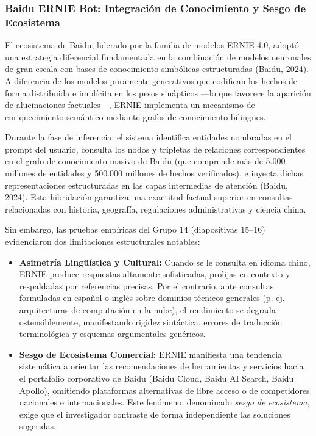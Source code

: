 \subsubsection{Baidu ERNIE Bot: Integración de Conocimiento y Sesgo de Ecosistema}

El ecosistema de Baidu, liderado por la familia de modelos ERNIE 4.0, adoptó una estrategia diferencial fundamentada en la combinación de modelos neuronales de gran escala con bases de conocimiento simbólicas estructuradas (Baidu, 2024). A diferencia de los modelos puramente generativos que codifican los hechos de forma distribuida e implícita en los pesos sinápticos ---lo que favorece la aparición de alucinaciones factuales---, ERNIE implementa un mecanismo de enriquecimiento semántico mediante grafos de conocimiento bilingües.

Durante la fase de inferencia, el sistema identifica entidades nombradas en el prompt del usuario, consulta los nodos y tripletas de relaciones correspondientes en el grafo de conocimiento masivo de Baidu (que comprende más de 5.000 millones de entidades y 500.000 millones de hechos verificados), e inyecta dichas representaciones estructuradas en las capas intermedias de atención (Baidu, 2024). Esta hibridación garantiza una exactitud factual superior en consultas relacionadas con historia, geografía, regulaciones administrativas y ciencia china.

Sin embargo, las pruebas empíricas del Grupo 14 (diapositivas 15--16) evidenciaron dos limitaciones estructurales notables:
\begin{itemize}
    \item \textbf{Asimetría Lingüística y Cultural:} Cuando se le consulta en idioma chino, ERNIE produce respuestas altamente sofisticadas, prolijas en contexto y respaldadas por referencias precisas. Por el contrario, ante consultas formuladas en español o inglés sobre dominios técnicos generales (p. ej. arquitecturas de computación en la nube), el rendimiento se degrada ostensiblemente, manifestando rigidez sintáctica, errores de traducción terminológica y esquemas argumentales genéricos.
    \item \textbf{Sesgo de Ecosistema Comercial:} ERNIE manifiesta una tendencia sistemática a orientar las recomendaciones de herramientas y servicios hacia el portafolio corporativo de Baidu (Baidu Cloud, Baidu AI Search, Baidu Apollo), omitiendo plataformas alternativas de libre acceso o de competidores nacionales e internacionales. Este fenómeno, denominado \textit{sesgo de ecosistema}, exige que el investigador contraste de forma independiente las soluciones sugeridas.
\end{itemize}

